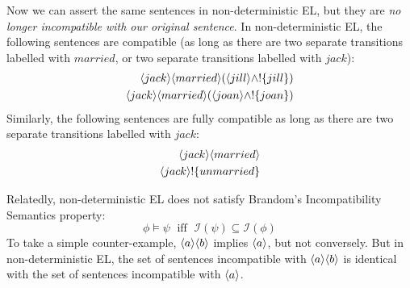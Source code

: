 Now we can assert the same sentences in non-deterministic EL, but they
are \emph{no longer incompatible with our original sentence}.  In
non-deterministic EL, the following sentences are compatible (as long
as there are two separate transitions labelled with $married$, or two
separate transitions labelled with $jack$):
\begin{eqnarray*}
\langle jack \rangle \langle married \rangle (\langle jill \rangle \land ! \{jill\}) \\
\langle jack \rangle \langle married \rangle (\langle joan \rangle \land ! \{joan\})
\end{eqnarray*}
Similarly, the following sentences are fully compatible as long as there are two separate transitions labelled with $jack$:
\begin{eqnarray*}
\langle jack \rangle \langle married \rangle \\
\langle jack \rangle ! \{unmarried\}
\end{eqnarray*}

Relatedly, non-deterministic EL does not satisfy Brandom's Incompatibility Semantics property:
\[
\phi \models \psi \; \mbox{ iff } \; \mathcal{I}(\psi) \subseteq \mathcal{I}(\phi)
\]
To take a simple counter-example, $\MAY{a}\MAY{b}$ implies $\MAY{a}$, but not conversely.
But in non-deterministic EL, the set of sentences incompatible with $\MAY{a}\MAY{b}$ is identical with the set of sentences incompatible with  $\MAY{a}$.





